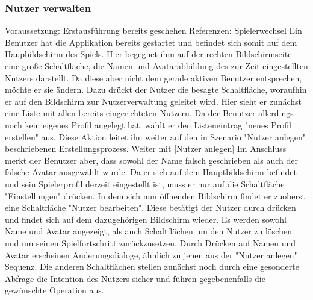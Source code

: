 \subsubsection{Nutzer verwalten}
Voraussetzung: Erstausführung bereits geschehen \newline
Referenzen: Spielerwechsel
\newline
\newline
Ein Benutzer hat die Applikation bereits gestartet und befindet sich somit
auf dem Haupbildschirm des Spiels. Hier begegnet ihm auf der rechten 
Bildschirmseite eine große Schaltfläche, die Namen und Avatarabbildung des 
zur Zeit eingestellten Nutzers darstellt. Da diese aber nicht dem gerade aktiven
Benutzer entsprechen, möchte er sie ändern. Dazu drückt der Nutzer die
besagte Schaltfläche, woraufhin er auf den Bildschirm zur Nutzerverwaltung 
geleitet wird. Hier sieht er zunächst eine Liste mit allen bereits 
eingerichteten Nutzern. Da der Benutzer allerdings noch kein eigenes Profil
angelegt hat, wählt er den Listeneintrag "neues Profil erstellen" aus.
Diese Aktion leitet ihn weiter auf den in Szenario "Nutzer anlegen" 
beschriebenen Erstellungsprozess.
\newline
\newline
Weiter mit {[}Nutzer anlegen{]}
\newline
\newline
Im Anschluss merkt der Benutzer aber, dass sowohl der Name falsch geschrieben
als auch der falsche Avatar ausgewählt wurde. Da er sich auf dem
Hauptbildschirm befindet und sein Spielerprofil derzeit eingestellt ist,
muss er nur auf die Schaltfläche "Einstellungen" drücken. In dem sich nun
öffnenden Bildschirm findet er zuoberst eine Schaltfläche "Nutzer bearbeiten".
Diese betätigt der Nutzer durch drücken und findet sich auf dem dazugehörigen
Bildschirm wieder. Es werden sowohl Name und Avatar angezeigt, als auch
Schaltflächen um den Nutzer zu löschen und um seinen Spielfortschritt
zurückzusetzen. Durch Drücken auf Namen und Avatar erscheinen Änderungsdialoge,
ähnlich zu jenen aus der "Nutzer anlegen" Sequenz. Die anderen Schaltflächen
stellen zunächst noch durch eine gesonderte Abfrage die Intention des 
Nutzers sicher und führen gegebenenfalls die gewünschte Operation aus.
